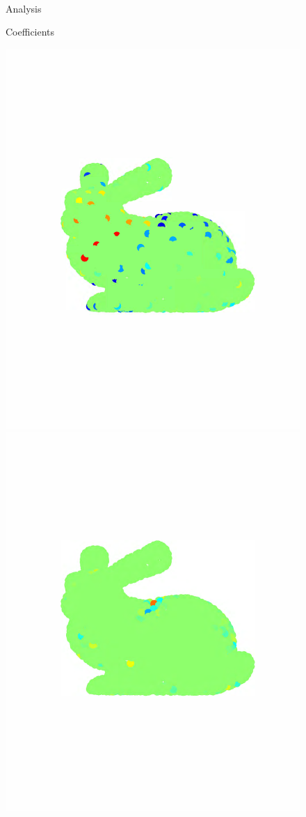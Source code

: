 \documentclass{article}
\begin{document}
\begin{figure}[bth]
\begin{minipage}[m]{0.16\linewidth}
\end{minipage}\\
\begin{minipage}[m]{0.16\linewidth}
\centerline{\small{Analysis}}
\centerline{\small{Coefficients}}
\end{minipage}
\begin{minipage}[m]{0.16\linewidth}
\centerline{\includegraphics[width=.8\linewidth]{fig_bunny_coef_scaling}}
\end{minipage}
\begin{minipage}[m]{0.16\linewidth}
\centerline{\includegraphics[width=.8\linewidth]{fig_bunny_coef_wav1}}

\end{minipage}
\end{figure}
\end{document}
